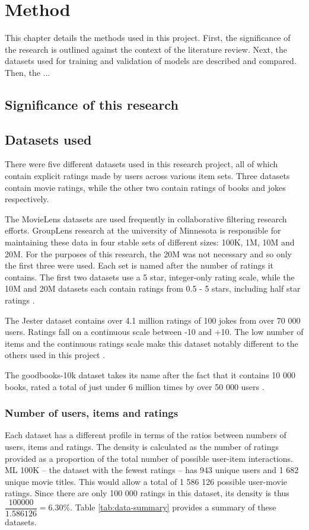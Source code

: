\chapter{Method}
This chapter details the methods used in this project. First, the significance of the research is outlined against the context of the literature review. Next, the datasets used for training and validation of models are described and compared. Then, the ...

\section{Significance of this research}

\section{Datasets used}
There were five different datasets used in this research project, all of which contain explicit ratings made by users across various item sets. Three datasets contain movie ratings, while the other two contain ratings of books and jokes respectively.

The MovieLens datasets are used frequently in collaborative filtering research efforts. GroupLens research at the university of Minnesota is responsible for maintaining these data in four stable sets of different sizes: 100K, 1M, 10M and 20M. For the purposes of this research, the 20M was not necessary and so only the first three were used. Each set is named after the number of ratings it contains. The first two datasets use a 5 star, integer-only rating scale, while the 10M and 20M datasets each contain ratings from 0.5 - 5 stars, including half star ratings \parencite{harper2016movielens}.

The Jester dataset contains over 4.1 million ratings of 100 jokes from over 70 000 users. Ratings fall on a continuous scale between -10 and +10. The low number of items and the continuous ratings scale make this dataset notably different to the others used in this project \parencite{cf_1.2_eigentaste}.

The goodbooks-10k dataset takes its name after the fact that it contains 10 000 books, rated a total of just under 6 million times by over 50 000 users \parencite{goodbooks2017}.

\subsection{Number of users, items and ratings}
Each dataset has a different profile in terms of the ratios between numbers of users, items and ratings. The density is calculated as the number of ratings provided as a proportion of the total number of possible user-item interactions. ML 100K -- the dataset with the fewest ratings -- has 943 unique users and 1 682 unique movie titles. This would allow a total of 1 586 126 possible user-movie ratings. Since there are only 100 000 ratings in this dataset, its density is thus $\dfrac{100000}{1.586126} = 6.30\%$. Table \ref{tab:data-summary} provides a summary of these datasets. 

